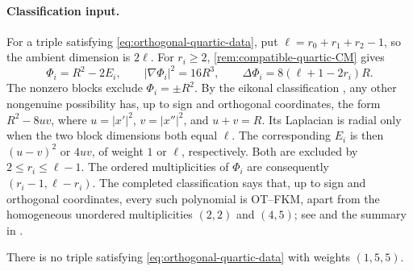 \paragraph{Classification input.}
For a triple satisfying \eqref{eq:orthogonal-quartic-data}, put
$\ell=r_0+r_1+r_2-1$, so the ambient dimension is $2\ell$.
For $r_i\ge2$, \cref{rem:compatible-quartic-CM} gives
\[
 \Phi_i=R^2-2E_i,\qquad
 |\nabla\Phi_i|^2=16R^3,\qquad
 \Delta\Phi_i=8(\ell+1-2r_i)R.
\]
The nonzero blocks exclude $\Phi_i=\pm R^2$. By the eikonal classification
\cite[Theorem~1 and the discussion of $m=4$]{TkachevIsoparametric14},
any other nongenuine possibility
has, up to sign and orthogonal coordinates, the form
$R^2-8uv$, where $u=|x'|^2$, $v=|x''|^2$, and $u+v=R$.
Its Laplacian is radial only when the two block dimensions both equal
$\ell$. The corresponding $E_i$ is then $(u-v)^2$ or $4uv$, of
weight $1$ or $\ell$, respectively. Both are excluded by
$2\le r_i\le\ell-1$.
The ordered multiplicities of $\Phi_i$ are consequently
$(r_i-1,\ell-r_i)$.
The completed classification says that, up to sign and orthogonal
coordinates, every such polynomial is OT--FKM, apart from the
homogeneous unordered multiplicities $(2,2)$ and $(4,5)$;
see \cite{ChiFourIII13,ChiFourIV20} and the summary in
\cite[Section~1]{GeTangSOS23}.

\begin{lemma}
\label{lem:quartic-exclude-155}
There is no triple satisfying \eqref{eq:orthogonal-quartic-data}
with weights $(1,5,5)$.
\end{lemma}

